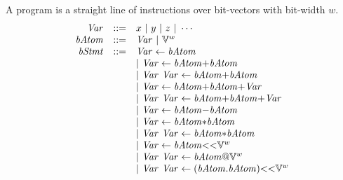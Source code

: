 A program is a straight line of instructions over bit-vectors with bit-width $w$.
\[
\begin{array}{rcl}
  \mathit{Var} & ::= & {x} \ |\ {y} \ |\ {z} \ |\ \cdots \\
  \mathit{bAtom} & ::= & \mathit{Var} \ |\ \mathbb{V}^w \\
  \mathit{bStmt} & ::= & \mathit{Var} \leftarrow \mathit{bAtom} \\
          &     & |\ \mathit{Var} \leftarrow \mathit{bAtom} {+} \mathit{bAtom} \\
          &     & |\ \mathit{Var}\ \mathit{Var} \leftarrow \mathit{bAtom} {+} \mathit{bAtom} \\
          &     & |\ \mathit{Var} \leftarrow \mathit{bAtom} {+} \mathit{bAtom} {+} \mathit{Var} \\
          &     & |\ \mathit{Var}\ \mathit{Var} \leftarrow \mathit{bAtom} {+} \mathit{bAtom} {+} \mathit{Var}  \\
          &     & |\ \mathit{Var} \leftarrow \mathit{bAtom} {-} \mathit{bAtom} \\
          &     & |\ \mathit{Var} \leftarrow \mathit{bAtom} {*} \mathit{bAtom} \\
          &     & |\ \mathit{Var}\ \mathit{Var} \leftarrow \mathit{bAtom} {*} \mathit{bAtom} \\
          &     & |\ \mathit{Var} \leftarrow \mathit{bAtom} {<<} \mathbb{V}^w \\
          &     & |\ \mathit{Var}\ \mathit{Var} \leftarrow \mathit{bAtom} {@} \mathbb{V}^w \\
          &     & |\ \mathit{Var}\ \mathit{Var} \leftarrow (\mathit{bAtom} {.} \mathit{bAtom}) {<<} \mathbb{V}^w
\end{array}
\]

